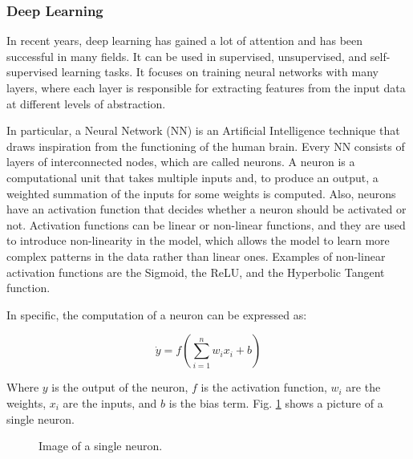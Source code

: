 \subsubsection{Deep Learning}
\label{subsubsec:dl}
In recent years, deep learning has gained a lot of attention and has been successful in many fields.
It can be used in supervised, unsupervised, and self-supervised learning tasks. It focuses on training neural networks with many layers, where each layer is responsible for extracting features from the input data at different levels of abstraction.

In particular, a Neural Network (NN) is an Artificial Intelligence technique that draws inspiration from the functioning of the human brain.
Every NN consists of layers of interconnected nodes, which are called neurons.
A neuron is a computational unit that takes multiple inputs and, to produce an output, a weighted summation of the inputs for some weights is computed.
Also, neurons have an activation function that decides whether a neuron should be activated or not.
Activation functions can be linear or non-linear functions, and they are used to introduce non-linearity in the model, which allows the model to learn more complex patterns in the data rather than linear ones.
Examples of non-linear activation functions are the Sigmoid, the ReLU, and the Hyperbolic Tangent function.

In specific, the computation of a neuron can be expressed as:

\begin{equation}
    \dot{y} = f(\sum_{i=1}^{n} w_i x_i + b)\label{eq:neuron}
\end{equation}

Where $y$ is the output of the neuron, $f$ is the activation function, $w_i$ are the weights, $x_i$ are the inputs, and $b$ is the bias term.
Fig. \ref{fig:single_neuron} shows a picture of a single neuron.



\begin{figure}[ht]
    \begin{center}
        \fbox{\rule[-.5cm]{0cm}{4cm} \rule[-.5cm]{4cm}{0cm}}
    \end{center}
    \caption{Image of a single neuron.}
    \label{fig:single_neuron}
\end{figure}


